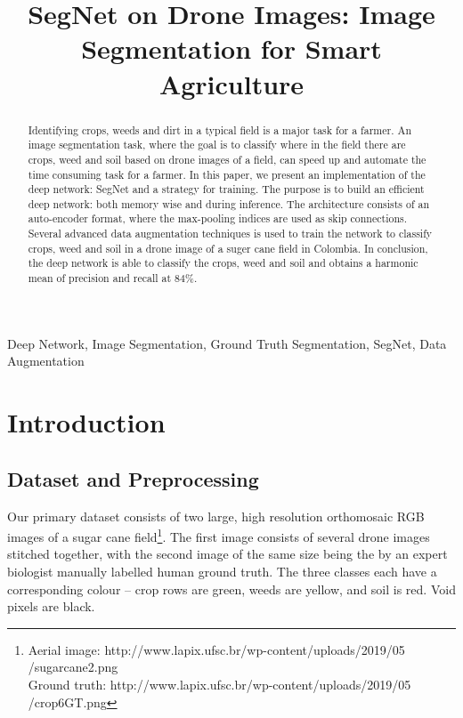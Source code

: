 \documentclass{article}
\title{SegNet on Drone Images: Image Segmentation for Smart Agriculture}
\begin{document}
%

\maketitle
%
\begin{abstract}
Identifying crops, weeds and dirt in a typical field is a major task for a farmer. An image segmentation task, where the goal is to classify where in the field there are crops, weed and soil based on drone images of a field, can speed up and automate the time consuming task for a farmer. In this paper, we present an implementation of the deep network: SegNet and a strategy for training. The purpose is to build an efficient deep network: both memory wise and during inference. The architecture consists of an auto-encoder format, where the max-pooling indices are used as skip connections. Several advanced data augmentation techniques is used to train the network to classify crops, weed and soil in a drone image of a suger cane field in Colombia. In conclusion, the deep network is able to classify the crops, weed and soil and obtains a harmonic mean of precision and recall at $ 84 \% $.
\end{abstract}
%
\begin{keywords}
Deep Network, Image Segmentation, Ground Truth Segmentation, SegNet, Data Augmentation
\end{keywords}
%
\section{Introduction}
\label{sec:intro}

\subsection{Dataset and Preprocessing}
Our primary dataset consists of two large, high resolution orthomosaic RGB images of a sugar cane field\footnote{Aerial image: http://www.lapix.ufsc.br/wp-content/uploads/2019/05\\/sugarcane2.png\\
Ground truth: http://www.lapix.ufsc.br/wp-content/uploads/2019/05\\/crop6GT.png}.
The first image consists of several drone images stitched together, with the second image of the same size being the by an expert biologist manually labelled human ground truth.
The three classes each have a corresponding colour -- crop rows are green, weeds are yellow, and soil is red.
Void pixels are black.
\end{document}
